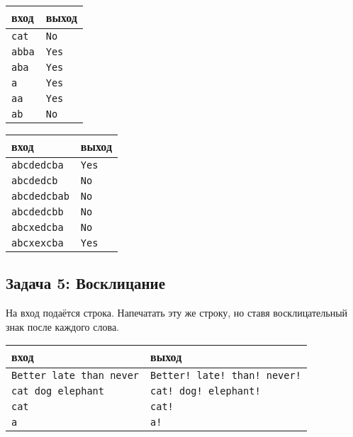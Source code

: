 \documentclass{article}
\begin{document}
\begin{multicols}{2}
\begin{center}
\begin{tabular}{ l | l }
 вход & выход \\ \hline
 \texttt{cat} & \texttt{No} \\
 \texttt{abba} & \texttt{Yes} \\
 \texttt{aba} & \texttt{Yes} \\
 \texttt{a} & \texttt{Yes} \\
 \texttt{aa} & \texttt{Yes} \\
 \texttt{ab} & \texttt{No} 
\end{tabular}
\end{center}


\begin{center}
\begin{tabular}{ l | l }
 вход & выход \\ \hline
 \texttt{abcdedcba} & \texttt{Yes} \\
 \texttt{abcdedcb} & \texttt{No} \\
 \texttt{abcdedcbab} & \texttt{No} \\
 \texttt{abcdedcbb} & \texttt{No} \\
 \texttt{abcxedcba} & \texttt{No} \\
 \texttt{abcxexcba} & \texttt{Yes} 
\end{tabular}
\end{center}
\end{multicols}


\subsection*{Задача 5: Восклицание}
На вход подаётся строка. Напечатать эту же строку, но ставя восклицательный знак после каждого слова.
\begin{center}
\begin{tabular}{ l | l }
 вход & выход \\ \hline
 \texttt{Better late than never} & \texttt{Better! late! than! never!} \\
 \texttt{cat \quad dog elephant} & \texttt{cat! \quad dog! elephant!}  \\ 
 \texttt{cat} & \texttt{cat!} \\
 \texttt{a} & \texttt{a!} \\
\end{tabular}
\end{center}
\end{document}
